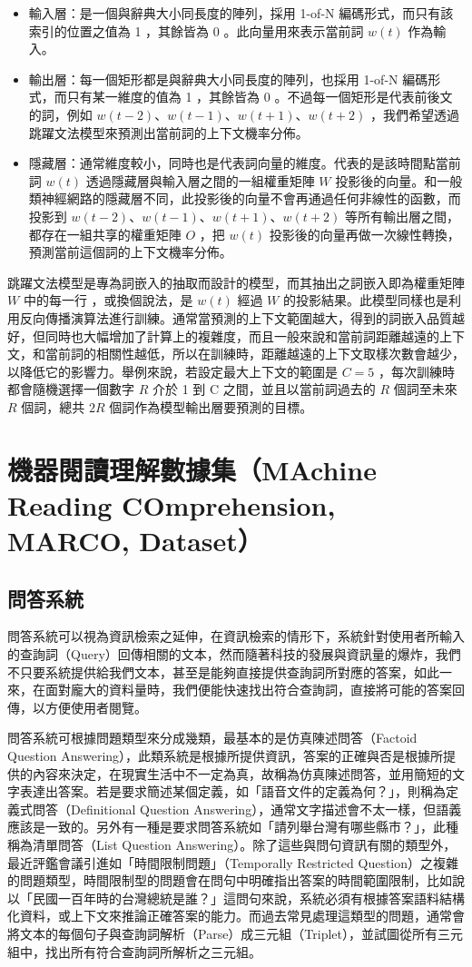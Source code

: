 \begin{itemize}
    \item 輸入層：是一個與辭典大小同長度的陣列，採用 1-of-N 編碼形式，而只有該索引的位置之值為 1 ，其餘皆為 0 。此向量用來表示當前詞 $w(t)$ 作為輸入。
    \item 輸出層：每一個矩形都是與辭典大小同長度的陣列，也採用 1-of-N 編碼形式，而只有某一維度的值為 1 ，其餘皆為 0 。不過每一個矩形是代表前後文的詞，例如 $w(t-2)$、$w(t-1)$、$w(t+1)$、$w(t+2)$ ，我們希望透過跳躍文法模型來預測出當前詞的上下文機率分佈。
    \item 隱藏層：通常維度較小，同時也是代表詞向量的維度。代表的是該時間點當前詞 $w(t)$ 透過隱藏層與輸入層之間的一組權重矩陣 $W$ 投影後的向量。和一般類神經網路的隱藏層不同，此投影後的向量不會再通過任何非線性的函數，而投影到 $w(t-2)$、$w(t-1)$、$w(t+1)$、$w(t+2)$ 等所有輸出層之間，都存在一組共享的權重矩陣 $O$ ，把 $w(t)$ 投影後的向量再做一次線性轉換，預測當前這個詞的上下文機率分佈。
\end{itemize}

跳躍文法模型是專為詞嵌入的抽取而設計的模型，而其抽出之詞嵌入即為權重矩陣 $W$ 中的每一行%
，或換個說法，是 $w(t)$ 經過 $W$ 的投影結果。此模型同樣也是利用反向傳播演算法進行訓練。通常當預測的上下文範圍越大，得到的詞嵌入品質越好，但同時也大幅增加了計算上的複雜度，而且一般來說和當前詞距離越遠的上下文，和當前詞的相關性越低，所以在訓練時，距離越遠的上下文取樣次數會越少，以降低它的影響力。舉例來說，若設定最大上下文的範圍是 $C=5$ ，每次訓練時都會隨機選擇一個數字 $R$ 介於 1 到 C 之間，並且以當前詞過去的 $R$ 個詞至未來 $R$ 個詞，總共 $2R$ 個詞作為模型輸出層要預測的目標。

\section{機器閱讀理解數據集（MAchine Reading COmprehension, MARCO, Dataset）}
\subsection{問答系統}
問答系統可以視為資訊檢索之延伸，在資訊檢索的情形下，系統針對使用者所輸入的查詢詞（Query）回傳相關的文本，然而隨著科技的發展與資訊量的爆炸，我們不只要系統提供給我們文本，甚至是能夠直接提供查詢詞所對應的答案，如此一來，在面對龐大的資料量時，我們便能快速找出符合查詢詞，直接將可能的答案回傳，以方便使用者閱覽。

問答系統可根據問題類型來分成幾類，最基本的是仿真陳述問答（Factoid Question Answering），此類系統是根據所提供資訊，答案的正確與否是根據所提供的內容來決定，在現實生活中不一定為真，故稱為仿真陳述問答，並用簡短的文字表達出答案。若是要求簡述某個定義，如「語音文件的定義為何？」，則稱為定義式問答（Definitional Question Answering），通常文字描述會不太一樣，但語義應該是一致的。另外有一種是要求問答系統如「請列舉台灣有哪些縣市？」，此種稱為清單問答（List Question Answering）。除了這些與問句資訊有關的類型外，最近評鑑會議引進如「時間限制問題」（Temporally Restricted Question）之複雜的問題類型，時間限制型的問題會在問句中明確指出答案的時間範圍限制，比如說以「民國一百年時的台灣總統是誰？」這問句來說，系統必須有根據答案語料結構化資料，或上下文來推論正確答案的能力。而過去常見處理這類型的問題，通常會將文本的每個句子與查詢詞解析（Parse）成三元組（Triplet），並試圖從所有三元組中，找出所有符合查詢詞所解析之三元組。

